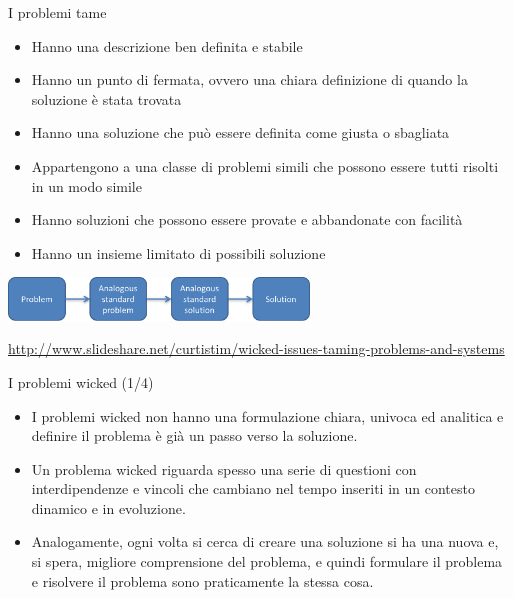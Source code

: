 \documentclass{beamer}
\begin{document}
\begin{frame}{\centerline{I problemi tame}}

\begin{itemize}
\item Hanno una descrizione ben definita e stabile
\item Hanno un punto di fermata, ovvero una chiara definizione di quando la soluzione \`{e} stata trovata
\item Hanno una soluzione che pu\`{o} essere definita come giusta o sbagliata
\item Appartengono a una classe di problemi simili che possono essere tutti risolti in un modo simile
\item Hanno soluzioni che possono essere provate e abbandonate con facilit\`{a}
\item Hanno un insieme limitato di possibili soluzione
\end{itemize}
\begin{center}
\includegraphics[width=80mm]{A2022.IDSEPC.ProcessoDiProduzione/pic-04.png}
\end{center}

\begin{center}
\tiny
\url{http://www.slideshare.net/curtistim/wicked-issues-taming-problems-and-systems}
\end{center}

\end{frame}


\begin{frame}{\centerline{I problemi wicked (1/4)}}

\small
\begin{itemize}
\item I problemi wicked non hanno una formulazione chiara, univoca ed analitica e definire il problema \`{e} gi\`{a} un passo verso la soluzione.

\item Un problema wicked riguarda spesso una serie di questioni con interdipendenze e vincoli che cambiano nel tempo inseriti in un contesto dinamico e in evoluzione.

\item Analogamente, ogni volta si cerca di creare una soluzione si ha una nuova e, si spera, migliore comprensione del problema, e quindi formulare il problema e risolvere il problema sono praticamente la stessa cosa.


\end{itemize}

\end{frame}
\end{document}
